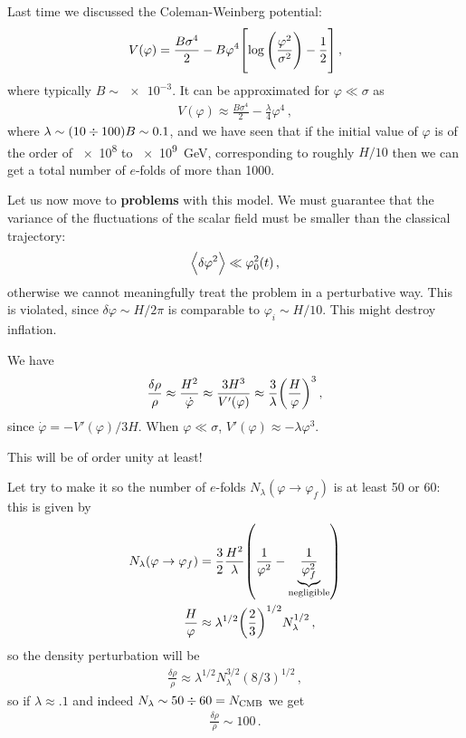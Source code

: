 \documentclass[main.tex]{subfiles}
\begin{document}

Last time we discussed the Coleman-Weinberg potential: 
%
\begin{align}
V(\varphi ) = \frac{B \sigma^{4}}{2} - B \varphi^{4}
\qty[\log \qty(\frac{\varphi^2}{\sigma^2}) - \frac{1}{2}]
\,,
\end{align}
%
where typically \(B \sim \num{e-3}\). 
It can be approximated for \(\varphi \ll \sigma \) as 
%
\begin{align}
V(\varphi ) \approx \frac{B \sigma^{4}}{2} - \frac{\lambda}{4} \varphi^{4}
\,,
\end{align}
%
where \(\lambda \sim (10 \divisionsymbol 100 )B \sim \num{.1}\), and we have seen that if the initial value of \(\varphi \) is of the order of \num{e8} to \SI{e9}{GeV}, corresponding to roughly \(H/10\) then we can get a total number of \(e\)-folds of more than 1000. 

Let us now move to \textbf{problems} with this model. 
We must guarantee that the variance of the fluctuations of the scalar field must be smaller than the classical trajectory: 
%
\begin{align}
\expval{ \delta \varphi^2} \ll \varphi_0^2 (t)
\,,
\end{align}
%
otherwise we cannot meaningfully treat the problem in a perturbative way. 
This is violated, since \(\delta \varphi \sim H / 2\pi \) is comparable to \(\varphi _i \sim H / 10\). 
This might destroy inflation. 

We have 
%
\begin{align}
\frac{ \delta \rho }{\rho } \approx \frac{H^2}{\dot{\varphi}} \approx \frac{3 H^3}{V'(\varphi )} \approx \frac{3}{\lambda } \qty(\frac{H}{\varphi })^3
\,,
\end{align}
%
since \(\dot{\varphi} = - V'(\varphi ) / 3H\). When \(\varphi \ll \sigma \), \(V' (\varphi ) \approx - \lambda \varphi^3\).

This will be of order unity at least! 

Let try to make it so the number of \(e\)-folds \(N_\lambda (\varphi \to \varphi _f)\) is at least 50 or 60: this is given by 
%
\begin{align}
N_\lambda (\varphi \to \varphi _f) &= \frac{3}{2} \frac{H^2}{\lambda } \qty( \frac{1}{\varphi^2} - \underbrace{\frac{1}{\varphi _f^2}}_{\text{negligible}})  \\
\frac{H}{\varphi } &\approx  \lambda^{1/2} \qty( \frac{2}{3})^{1/2} N_\lambda^{1/2}
\,,
\end{align}
%
so the density perturbation will be 
%
\begin{align}
\frac{ \delta \rho }{\rho } \approx \lambda^{1/2} N_\lambda^{3/2} (8/3)^{1/2}
\,,
\end{align}
%
so if \(\lambda \approx \num{.1}\) and indeed \(N_\lambda \sim 50 \divisionsymbol 60 = N _{\text{CMB}}\) we get 
%
\begin{align}
\frac{ \delta \rho }{\rho } \sim 100
\,.
\end{align}
\end{document}
